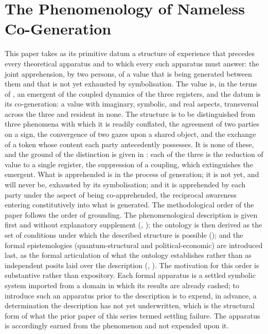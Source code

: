 \section{The Phenomenology of Nameless Co-Generation}
\label{p10:sec:phenomenology}

\noindent
This paper takes as its primitive datum a structure of experience that precedes every theoretical apparatus and to which every such apparatus must answer: the joint apprehension, by two persons, of a value that is being generated between them and that is not yet exhausted by symbolisation. The value is, in the terms of , an emergent of the coupled dynamics of the three registers, and the datum is its co-generation: a value with imaginary, symbolic, and real aspects, transversal across the three and resident in none. The structure is to be distinguished from three phenomena with which it is readily conflated, the agreement of two parties on a sign, the convergence of two gazes upon a shared object, and the exchange of a token whose content each party antecedently possesses. It is none of these, and the ground of the distinction is given in : each of the three is the reduction of value to a single register, the suppression of a coupling, which extinguishes the emergent. What is apprehended is in the process of generation; it is not yet, and will never be, exhausted by its symbolisation; and it is apprehended by each party under the aspect of being co-apprehended, the reciprocal awareness entering constitutively into what is generated. The methodological order of the paper follows the order of grounding. The phenomenological description is given first and without explanatory supplement (, ); the ontology is then derived as the set of conditions under which the described structure is possible (); and the formal epistemologies (quantum-structural and political-economic) are introduced last, as the formal articulation of what the ontology establishes rather than as independent posits laid over the description (, ). The motivation for this order is substantive rather than expository. Each formal apparatus is a settled symbolic system imported from a domain in which its results are already cashed; to introduce such an apparatus prior to the description is to expend, in advance, a determination the description has not yet underwritten, which is the structural form of what the prior paper of this series termed settling failure. The apparatus is accordingly earned from the phenomenon and not expended upon it.

